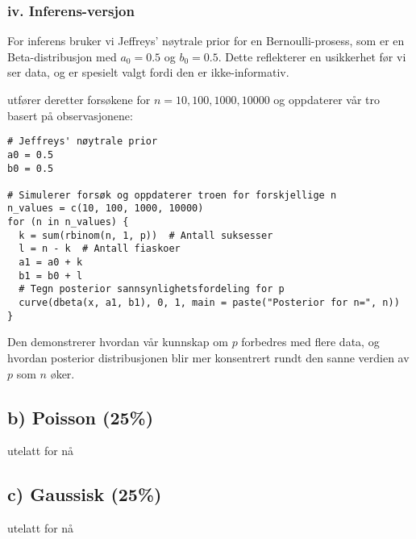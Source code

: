 \documentclass{article}
\begin{document}
\subsubsection*{iv. Inferens-versjon}

For inferens bruker vi Jeffreys' nøytrale prior for en Bernoulli-prosess, som er en Beta-distribusjon med \(a_0 = 0.5\) og \(b_0 = 0.5\). Dette reflekterer en usikkerhet før vi ser data, og er spesielt valgt fordi den er ikke-informativ.

utfører deretter forsøkene for \(n = 10, 100, 1000, 10000\) og oppdaterer vår tro basert på observasjonene:

\begin{verbatim}
# Jeffreys' nøytrale prior
a0 = 0.5
b0 = 0.5

# Simulerer forsøk og oppdaterer troen for forskjellige n
n_values = c(10, 100, 1000, 10000)
for (n in n_values) {
  k = sum(rbinom(n, 1, p))  # Antall suksesser
  l = n - k  # Antall fiaskoer
  a1 = a0 + k
  b1 = b0 + l
  # Tegn posterior sannsynlighetsfordeling for p
  curve(dbeta(x, a1, b1), 0, 1, main = paste("Posterior for n=", n))
}
\end{verbatim}

 Den demonstrerer hvordan vår kunnskap om \(p\) forbedres med flere data, og hvordan posterior distribusjonen blir mer konsentrert rundt den sanne verdien av \(p\) som \(n\) øker.

\subsection*{b) Poisson (25\%)}
utelatt for nå

\subsection*{c) Gaussisk (25\%)}
utelatt for nå
\end{document}
